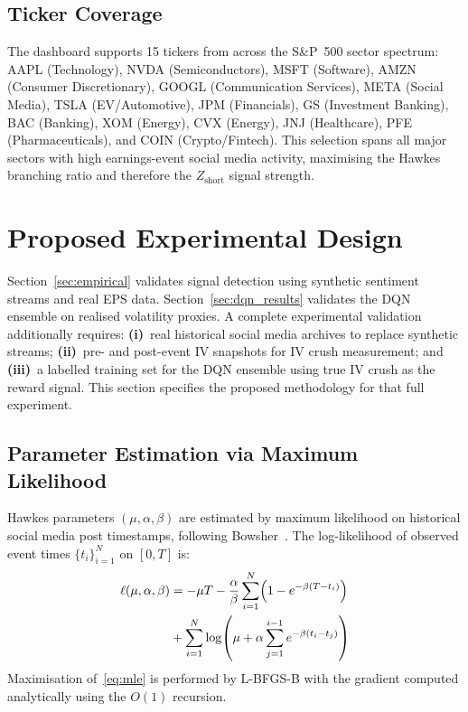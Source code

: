\documentclass[10pt,twocolumn]{article}
\newcommand{\Zshort}{Z_{\mathrm{short}}}
\begin{document}
\subsection{Ticker Coverage}

The dashboard supports 15 tickers from across the S\&P~500 sector spectrum:
AAPL (Technology), NVDA (Semiconductors), MSFT (Software), AMZN (Consumer
Discretionary), GOOGL (Communication Services), META (Social Media), TSLA
(EV/Automotive), JPM (Financials), GS (Investment Banking), BAC (Banking),
XOM (Energy), CVX (Energy), JNJ (Healthcare), PFE (Pharmaceuticals), and
COIN (Crypto/Fintech). This selection spans all major sectors with high
earnings-event social media activity, maximising the Hawkes branching ratio
and therefore the $\Zshort$ signal strength.

\section{Proposed Experimental Design}
\label{sec:design}

Section~\ref{sec:empirical} validates signal detection using synthetic
sentiment streams and real EPS data. Section~\ref{sec:dqn_results} validates
the DQN ensemble on realised volatility proxies. A complete experimental
validation additionally requires: \textbf{(i)}~real historical social media
archives to replace synthetic streams; \textbf{(ii)}~pre- and post-event IV
snapshots for IV crush measurement; and \textbf{(iii)}~a labelled training
set for the DQN ensemble using true IV crush as the reward signal. This
section specifies the proposed methodology for that full experiment.

\subsection{Parameter Estimation via Maximum Likelihood}

Hawkes parameters $(\mu,\alpha,\beta)$ are estimated by maximum likelihood on
historical social media post timestamps, following Bowsher~\cite{bowsher2007}.
The log-likelihood of observed event times $\{t_i\}_{i=1}^N$ on $[0,T]$ is:
\begin{align}
\label{eq:mle}
\ell(\mu,\alpha,\beta)&=-\mu T
  -\frac{\alpha}{\beta}\sum_{i=1}^N\!\left(1-e^{-\beta(T-t_i)}\right)\notag\\
  &+\sum_{i=1}^N\log\!\left(\mu+\alpha\sum_{j=1}^{i-1}e^{-\beta(t_i-t_j)}\right)
\end{align}
Maximisation of~\eqref{eq:mle} is performed by L-BFGS-B with the gradient
computed analytically using the $O(1)$ recursion.
\end{document}
